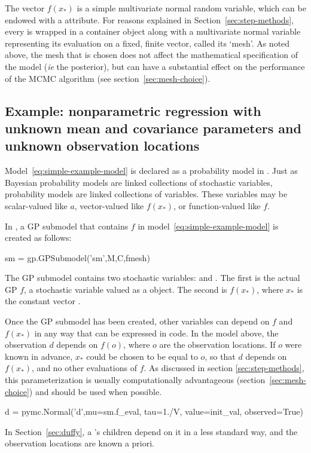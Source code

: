 \documentclass[article]{jss}
\begin{document}
The vector $f(x_*)$ is a simple multivariate normal random variable, which can be endowed with a  attribute. For reasons explained in Section~\ref{sec:step-methods}, every  is wrapped in a  container object along with a multivariate normal variable representing its evaluation on a fixed, finite vector, called its `mesh'. As noted above, the mesh that is chosen does not affect the mathematical specification of the model (\emph{ie} the posterior), but can have a substantial effect on the performance of the MCMC algorithm (see section~\ref{sec:mesh-choice}).  

\subsection{Example: nonparametric regression with unknown mean and covariance parameters and unknown observation locations}\label{sub:BasicMCMC}

Model~\ref{eq:simple-example-model} is declared as a  probability model in . Just as Bayesian probability models are linked collections of stochastic variables,  probability models are linked collections of  variables. These variables may be scalar-valued like $a$, vector-valued like $f(x_*)$, or function-valued like $f$.

In , a GP submodel that contains $f$ in model~\ref{eq:simple-example-model} is created as follows:
\begin{CodeChunk}
\begin{CodeInput}
sm = gp.GPSubmodel('sm',M,C,fmesh)
\end{CodeInput}
\end{CodeChunk}
The GP submodel contains two stochastic variables:  and . The first is the actual GP $f$, a stochastic variable valued as a  object. The second is $f(x_*)$, where $x_*$ is the constant vector .

Once the GP submodel has been created, other variables can depend on $f$ and $f(x_*)$ in any way that can be expressed in  code. In the model above, the observation $d$ depends on $f(o)$, where $o$ are the observation locations. If $o$ were known in advance, $x_*$ could be chosen to be equal to $o$, so that $d$ depends on $f(x_*)$, and no other evaluations of $f$. As discussed in section \ref{sec:step-methods}, this parameterization is usually computationally advantageous (section~\ref{sec:mesh-choice}) and should be used when possible. 
\begin{CodeChunk}
\begin{CodeInput}
d = pymc.Normal('d',mu=sm.f_eval, tau=1./V, value=init_val, observed=True)
\end{CodeInput}
\end{CodeChunk}
In Section~\ref{sec:duffy}, a 's children depend on it in a less standard way, and the observation locations are known a priori. 
\end{document}

